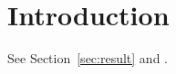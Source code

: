 \documentclass{article}
\begin{document}
\section{Introduction}
See Section~\ref{sec:result} and \cite{doe2024book,example2025data}.



\end{document}
